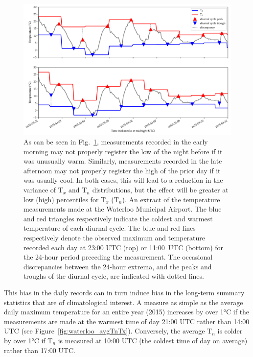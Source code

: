 \documentclass[letter]{article}
\makeatletter
\def\maxwidth{\ifdim\Gin@nat@width>\linewidth\linewidth
\else\Gin@nat@width\fi}
\let\Oldincludegraphics\includegraphics
\renewcommand{\includegraphics}[1]{\Oldincludegraphics[width=0.98\maxwidth]{#1}}
\newcommand{\T}{\mathrm{T}}
\newcommand{\Tn}{\T_{n}}
\newcommand{\Tx}{\T_{x}}
\makeatother
\begin{document}
 \begin{figure}[!h]
\centering
\includegraphics{../figures/waterloo_triangles.pdf}
\caption{\label{fig:waterloo_triangles}
As can be seen in Fig.~\ref{fig:waterloo_triangles}, measurements recorded in the early morning may not properly register the low of the night before if it was unusually warm. Similarly, measurements recorded in the late afternoon may not properly register the high of the prior day if it was usually cool. In both cases, this will lead to a reduction in the variance of $\Tx$ and $\Tn$ distributions, but the effect will be greater at low (high) percentiles for $\Tx$ ($\Tn$). 
An extract of the temperature measurements made at the Waterloo Municipal Airport.
The blue and red triangles respectively indicate the coldest and warmest temperature of each diurnal cycle.
The blue and red lines respectively denote the observed maximum and temperature recorded each day at 23:00 UTC (top) or 11:00~UTC (bottom) for the 24-hour period preceding the measurement.
The occasional discrepancies between the 24-hour extrema, and the peaks and troughs of the diurnal cycle, are indicated with dotted lines.}
\end{figure}

 This bias in the daily records can in turn induce bias in the long-term summary statistics that are of climatological interest.
A measure as simple as the average daily maximum temperature for an entire year (2015) increases by over 1°C if the measurements are made at the warmest time of day 21:00 UTC rather than 14:00 UTC (see Figure~\ref{fig:waterloo_avgTnTx}).
Conversely, the average \(\Tn\) is colder by over 1°C if \(\Tn\) is measured at 10:00 UTC (the coldest time of day on average) rather than 17:00 UTC.
\end{document}
